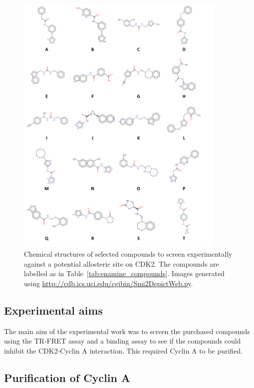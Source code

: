 \begin{figure}
\centering

\includegraphics[width=0.9\textwidth]{figures/compound_structures/compound_structures}

\caption{Chemical structures of selected compounds to screen experimentally against a potential allosteric site on CDK2.
The compounds are labelled as in Table~\ref{tab:enamine_compounds}.
Images generated using \url{http://cdb.ics.uci.edu/cgibin/Smi2DepictWeb.py}.}

\label{fig:compound_structures}
\end{figure}


\subsection{Experimental aims}

The main aim of the experimental work was to screen the purchased compounds using the TR-FRET assay and a binding assay to see if the compounds could inhibit the CDK2-Cyclin A interaction.
This required Cyclin A to be purified.


\subsection{Purification of Cyclin A}

